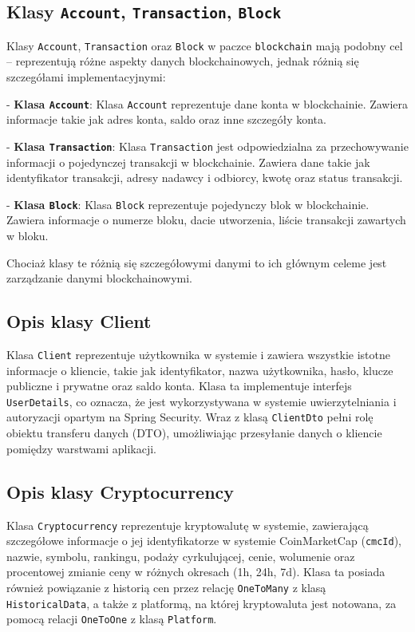 \subsection{Klasy \texttt{Account}, \texttt{Transaction}, \texttt{Block}}

Klasy \texttt{Account}, \texttt{Transaction} oraz \texttt{Block} w paczce \texttt{blockchain} mają podobny cel – reprezentują różne aspekty danych blockchainowych, jednak różnią się szczegółami implementacyjnymi:

- \textbf{Klasa \texttt{Account}}: 
  Klasa \texttt{Account} reprezentuje dane konta w blockchainie. Zawiera informacje takie jak adres konta, saldo oraz inne szczegóły konta. 

- \textbf{Klasa \texttt{Transaction}}: 
  Klasa \texttt{Transaction} jest odpowiedzialna za przechowywanie informacji o pojedynczej transakcji w blockchainie. Zawiera dane takie jak identyfikator transakcji, adresy nadawcy i odbiorcy, kwotę oraz status transakcji.
	
- \textbf{Klasa \texttt{Block}}: 
  Klasa \texttt{Block} reprezentuje pojedynczy blok w blockchainie. Zawiera informacje o numerze bloku, dacie utworzenia, liście transakcji zawartych w bloku. 

Chociaż klasy te różnią się szczegółowymi danymi to ich głównym celeme jest zarządzanie danymi blockchainowymi.

\subsection{Opis klasy Client}

Klasa \texttt{Client} reprezentuje użytkownika w systemie i zawiera wszystkie istotne informacje o kliencie, takie jak identyfikator, nazwa użytkownika, hasło, klucze publiczne i prywatne oraz saldo konta. Klasa ta implementuje interfejs \texttt{UserDetails}, co oznacza, że jest wykorzystywana w systemie uwierzytelniania i autoryzacji opartym na Spring Security. Wraz z klasą \texttt{ClientDto} pełni rolę obiektu transferu danych (DTO), umożliwiając przesyłanie danych o kliencie pomiędzy warstwami aplikacji.

\subsection{Opis klasy Cryptocurrency}

Klasa \texttt{Cryptocurrency} reprezentuje kryptowalutę w systemie, zawierającą szczegółowe informacje o jej identyfikatorze w systemie CoinMarketCap (\texttt{cmcId}), nazwie, symbolu, rankingu, podaży cyrkulującej, cenie, wolumenie oraz procentowej zmianie ceny w różnych okresach (1h, 24h, 7d). Klasa ta posiada również powiązanie z historią cen przez relację \texttt{OneToMany} z klasą \texttt{HistoricalData}, a także z platformą, na której kryptowaluta jest notowana, za pomocą relacji \texttt{OneToOne} z klasą \texttt{Platform}.

